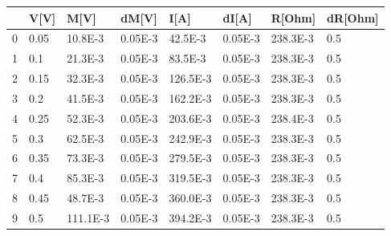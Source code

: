 \begin{tabular}{llllllll}
\toprule
{} &  V[V] &      M[V] &    dM[V] &      I[A] &    dI[A] &    R[Ohm] & dR[Ohm] \\
\midrule
0 &  0.05 &   10.8E-3 &  0.05E-3 &   42.5E-3 &  0.05E-3 &  238.3E-3 &     0.5 \\
1 &   0.1 &   21.3E-3 &  0.05E-3 &   83.5E-3 &  0.05E-3 &  238.3E-3 &     0.5 \\
2 &  0.15 &   32.3E-3 &  0.05E-3 &  126.5E-3 &  0.05E-3 &  238.3E-3 &     0.5 \\
3 &   0.2 &   41.5E-3 &  0.05E-3 &  162.2E-3 &  0.05E-3 &  238.3E-3 &     0.5 \\
4 &  0.25 &   52.3E-3 &  0.05E-3 &  203.6E-3 &  0.05E-3 &  238.4E-3 &     0.5 \\
5 &   0.3 &   62.5E-3 &  0.05E-3 &  242.9E-3 &  0.05E-3 &  238.3E-3 &     0.5 \\
6 &  0.35 &   73.3E-3 &  0.05E-3 &  279.5E-3 &  0.05E-3 &  238.3E-3 &     0.5 \\
7 &   0.4 &   85.3E-3 &  0.05E-3 &  319.5E-3 &  0.05E-3 &  238.3E-3 &     0.5 \\
8 &  0.45 &   48.7E-3 &  0.05E-3 &  360.0E-3 &  0.05E-3 &  238.3E-3 &     0.5 \\
9 &   0.5 &  111.1E-3 &  0.05E-3 &  394.2E-3 &  0.05E-3 &  238.3E-3 &     0.5 \\
\bottomrule
\end{tabular}
